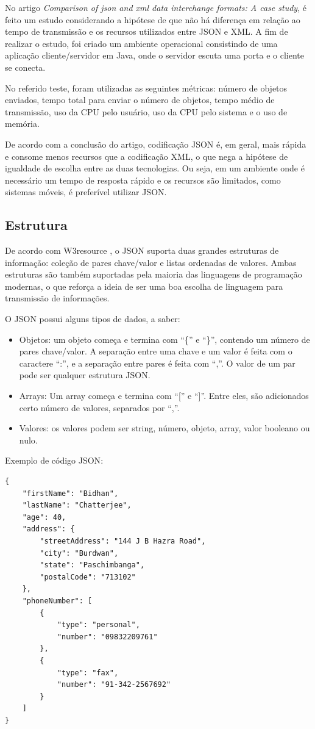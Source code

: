 	No artigo \emph{Comparison of json and xml data interchange formats: A case study}\cite{comparexmljson}, é feito um estudo considerando a hipótese de que não há diferença em relação ao tempo de transmissão e os recursos utilizados entre \ac{JSON} e \ac{XML}. A fim de realizar o estudo, foi criado um ambiente operacional consistindo de uma aplicação cliente/servidor em Java, onde o servidor escuta uma porta e o cliente se conecta. 

	No referido teste, foram utilizadas as seguintes métricas: número de objetos enviados, tempo total para enviar o número de objetos, tempo médio de transmissão, uso da CPU pelo usuário, uso da CPU pelo sistema e o uso de memória.

	De acordo com a conclusão do artigo, codificação \ac{JSON} é, em geral, mais rápida e consome menos recursos que a codificação \ac{XML}, o que nega a hipótese de igualdade de escolha entre as duas tecnologias. Ou seja, em um ambiente onde é necessário um  tempo de resposta rápido e os recursos são limitados, como sistemas móveis, é preferível utilizar \ac{JSON}.

\subsection{Estrutura}
	De acordo com W3resource \cite{w3json}, o \ac{JSON} suporta duas grandes estruturas de informação: coleção de pares chave/valor e listas ordenadas de valores. Ambas estruturas são também suportadas pela maioria das linguagens de programação modernas, o que reforça a ideia de ser uma boa escolha de linguagem para transmissão de informações.
	
	O \ac{JSON} possui alguns tipos de dados, a saber:
\begin{itemize}
\item Objetos: um objeto começa e termina com ``\{'' e ``\}'', contendo um número de pares chave/valor.  A separação entre uma chave e um valor é feita com o caractere ``:'',  e a separação entre pares é feita com ``,''. O valor de um par pode ser qualquer estrutura \ac{JSON}.
\item Arrays: Um array começa e termina com ``['' e ``]''. Entre eles, são adicionados certo número de valores, separados por ``,''. 
\item Valores: os valores podem ser string, número, objeto, array, valor booleano ou nulo.
\end{itemize}
Exemplo de código \ac{JSON}:

\begin{lstlisting}
{
    "firstName": "Bidhan",
    "lastName": "Chatterjee",
    "age": 40,
    "address": {
        "streetAddress": "144 J B Hazra Road",
        "city": "Burdwan",
        "state": "Paschimbanga",
        "postalCode": "713102"
    },
    "phoneNumber": [
        {
            "type": "personal",
            "number": "09832209761"
        },
        {
            "type": "fax",
            "number": "91-342-2567692"
        }
    ]
}
\end{lstlisting}

